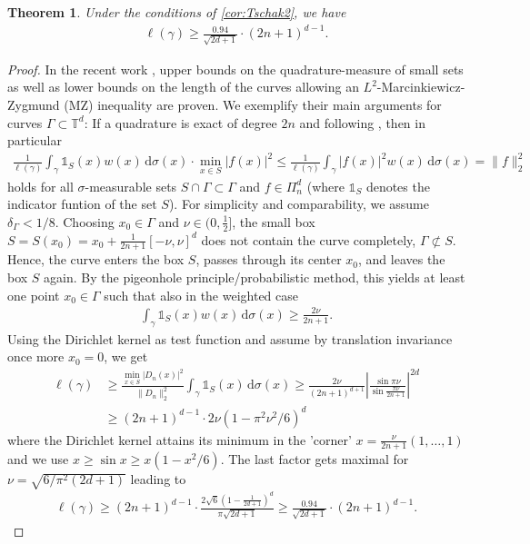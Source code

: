 \documentclass[11pt,a4paper,twoside,final,biblatex]{scrartcl}
\newcommand{\T}{\ensuremath{\mathbb{T}}}
\renewcommand{\d}{\,\mathrm{d}}
\newtheorem{theorem}{Theorem}[section]
\theoremstyle{definition}
\numberwithin{equation}{section}
\numberwithin{table}{section}
\numberwithin{figure}{section}
\begin{document}
\begin{theorem}\label{thm:Improv}
 Under the conditions of \cref{cor:Tschak2}, we have
 \begin{align*}
     \ell(\gamma)
     \ge \frac{0.94}{\sqrt{2d+1}} \cdot (2n+1)^{d-1}.
 \end{align*}
\end{theorem}
\begin{proof}
 In the recent work \cite{EhGr26}, upper bounds on the quadrature-measure of small sets as well as lower bounds on the length of the curves allowing an $L^2$-Marcinkiewicz-Zygmund (MZ) inequality are proven.
 We exemplify their main arguments for curves $\Gamma\subset\T^d$: If a quadrature is exact of degree $2n$ and following \cite[Sect.~4.1]{EhGr26}, then in particular 
 \begin{align*}
     \frac{1}{\ell(\gamma)}\int_{\gamma} \mathds{1}_{S}(x) w(x)\d\sigma(x) \cdot \min_{x\in S}|f(x)|^2 \le 
     \frac{1}{\ell(\gamma)}\int_{\gamma}|f(x)|^2 w(x) \d\sigma(x)=\|f\|_2^2
 \end{align*}
 holds for all $\sigma$-measurable sets $S\cap\Gamma\subset \Gamma$ and $f\in\Pi_n^d$ (where $\mathds{1}_{S}$ denotes the indicator funtion of the set $S$).
 For simplicity and comparability, we assume $\delta_{\Gamma}<1/8$. Choosing $x_0\in\Gamma$ and $\nu\in(0,\frac12]$, the small box $S=S(x_0)=x_0+\frac{1}{2n+1}[-\nu,\nu]^d$ does not contain the curve completely, $\Gamma\not\subset S$.
 Hence, the curve enters the box $S$, passes through its center $x_0$, and leaves the box $S$ again. By the pigeonhole principle/probabilistic method, this yields at least one point $x_0\in\Gamma$ such that also in the weighted case
 \begin{align*}
  \int_{\gamma} \mathds{1}_{S}(x) w(x)\d\sigma(x)\ge \frac{2\nu}{2n+1}.   
 \end{align*}
 Using the Dirichlet kernel as test function and assume by translation invariance once more $x_0=0$, we get
 \begin{align*}
     \ell(\gamma)
     &\ge
     \frac{\min_{x\in S}|D_n(x)|^2}{\|D_n\|_2^2}\int_{\gamma} \mathds{1}_{S}(x)\d\sigma(x)
     \ge
     \frac{2\nu}{(2n+1)^{d+1}} \left|\frac{\sin\pi\nu}{\sin\frac{\pi \nu}{2n+1}}\right|^{2d}\\
     &\ge (2n+1)^{d-1}\cdot 2\nu(1-\pi^2\nu^2/6)^d
 \end{align*}
 where the Dirichlet kernel attains its minimum in the 'corner' $x=\frac{\nu}{2n+1}(1,\hdots,1)$ and we use $x\ge\sin x\ge x(1-x^2/6)$.
 The last factor gets maximal for $\nu= \sqrt{6/\pi^2 (2 d + 1)}$ leading to
 \begin{align*}
     \ell(\gamma)
     \ge (2n+1)^{d-1}\cdot \frac{2\sqrt{6}\left(1-\frac{1}{2d+1}\right)^d}{\pi\sqrt{2d+1}}
     \ge \frac{0.94}{\sqrt{2d+1}} \cdot (2n+1)^{d-1}.
 \end{align*}
\end{proof}  
 
\end{document}
